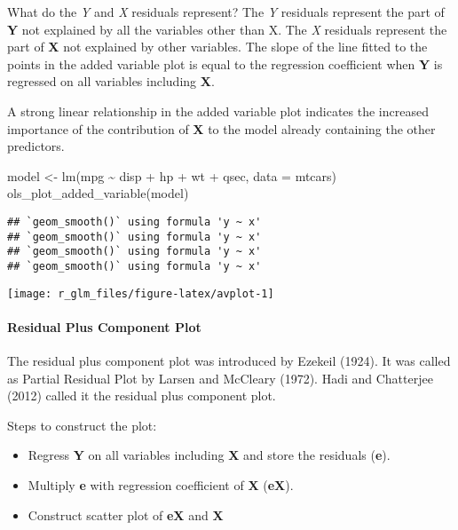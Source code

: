 \documentclass[
]{article}
\newenvironment{Shaded}{\begin{snugshade}}{\end{snugshade}}
\newcommand{\AttributeTok}[1]{\textcolor[rgb]{0.77,0.63,0.00}{#1}}
\newcommand{\FunctionTok}[1]{\textcolor[rgb]{0.00,0.00,0.00}{#1}}
\newcommand{\NormalTok}[1]{#1}
\newcommand{\OtherTok}[1]{\textcolor[rgb]{0.56,0.35,0.01}{#1}}
\newcommand{\SpecialCharTok}[1]{\textcolor[rgb]{0.00,0.00,0.00}{#1}}
\providecommand{\tightlist}{%
  \setlength{\itemsep}{0pt}\setlength{\parskip}{0pt}}
\begin{document}
What do the \emph{Y} and \emph{X} residuals represent? The \emph{Y}
residuals represent the part of \textbf{Y} not explained by all the
variables other than X. The \emph{X} residuals represent the part of
\textbf{X} not explained by other variables. The slope of the line
fitted to the points in the added variable plot is equal to the
regression coefficient when \textbf{Y} is regressed on all variables
including \textbf{X}.

A strong linear relationship in the added variable plot indicates the
increased importance of the contribution of \textbf{X} to the model
already containing the other predictors.

\begin{Shaded}
\begin{Highlighting}[]
\NormalTok{model }\OtherTok{\textless{}{-}} \FunctionTok{lm}\NormalTok{(mpg }\SpecialCharTok{\textasciitilde{}}\NormalTok{ disp }\SpecialCharTok{+}\NormalTok{ hp }\SpecialCharTok{+}\NormalTok{ wt }\SpecialCharTok{+}\NormalTok{ qsec, }\AttributeTok{data =}\NormalTok{ mtcars)}
\FunctionTok{ols\_plot\_added\_variable}\NormalTok{(model)}
\end{Highlighting}
\end{Shaded}

\begin{verbatim}
## `geom_smooth()` using formula 'y ~ x'
## `geom_smooth()` using formula 'y ~ x'
## `geom_smooth()` using formula 'y ~ x'
## `geom_smooth()` using formula 'y ~ x'
\end{verbatim}

\begin{center}\texttt{[image: r\_glm\_files/figure-latex/avplot-1]} \end{center}

\hypertarget{residual-plus-component-plot}{%
\paragraph{Residual Plus Component
Plot}\label{residual-plus-component-plot}}

The residual plus component plot was introduced by Ezekeil (1924). It
was called as Partial Residual Plot by Larsen and McCleary (1972). Hadi
and Chatterjee (2012) called it the residual plus component plot.

Steps to construct the plot:

\begin{itemize}
\tightlist
\item
  Regress \textbf{Y} on all variables including \textbf{X} and store the
  residuals (\textbf{e}).
\item
  Multiply \textbf{e} with regression coefficient of \textbf{X}
  (\textbf{eX}).
\item
  Construct scatter plot of \textbf{eX} and \textbf{X}
\end{itemize}
\end{document}
